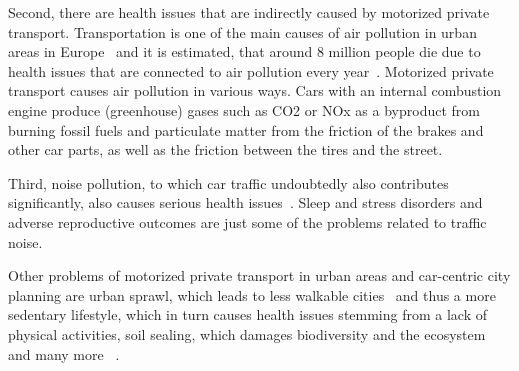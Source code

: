 Second, there are health issues that are indirectly caused by motorized private transport.
Transportation is one of the main causes of air pollution in urban areas in Europe~\cite{european2019european} and it is estimated, that around 8 million people die due to health issues that are connected to air pollution every year~\cite{forouzanfar2016global}. 
Motorized private transport causes air pollution in various ways.
Cars with an internal combustion engine produce (greenhouse) gases such as CO2 or NOx as a byproduct from burning fossil fuels and particulate matter from the friction of the brakes and other car parts, as well as the friction between the tires and the street.

Third, noise pollution, to which car traffic undoubtedly also contributes significantly, also causes serious health issues~\cite{khreis2016health}.
Sleep and stress disorders and adverse reproductive outcomes are just some of the problems related to traffic noise.

Other problems of motorized private transport in urban areas and car-centric city planning are urban sprawl, which leads to less walkable cities~\cite{patacchini2009urban} and thus a more sedentary lifestyle, which in turn causes health issues stemming from a lack of physical activities, soil sealing, which damages biodiversity and the ecosystem~\cite{tobias2018soil} and many more ~\cite{bozovic2021non,pritchard2022maas,mayers2020whose}.  


